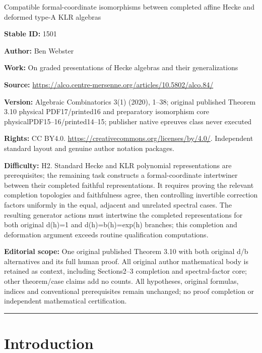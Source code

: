 \documentclass[10pt]{article}
\theoremstyle{definition}
\begin{document}
\glsaddall
\begin{center}\Large Compatible formal-coordinate isomorphisms between completed affine Hecke and deformed type-A KLR algebras\end{center}
\noindent\textbf{Stable ID:} 1501\par
\noindent\textbf{Author:} Ben Webster\par
\noindent\textbf{Work:} On graded presentations of Hecke algebras and their generalizations\par
\noindent\textbf{Source:} \url{https://alco.centre-mersenne.org/articles/10.5802/alco.84/}\par
\noindent\textbf{Version:} Algebraic Combinatorics 3(1) (2020), 1--38; original published Theorem 3.10 physical PDF17/printed16 and preparatory isomorphism core physicalPDF15--16/printed14--15; publisher native epreuves class never executed\par
\noindent\textbf{Rights:} CC BY4.0. \url{https://creativecommons.org/licenses/by/4.0/}. Independent standard layout and genuine author notation packages.\par
\noindent\textbf{Difficulty:} H2. Standard Hecke and KLR polynomial representations are prerequisites; the remaining task constructs a formal-coordinate intertwiner between their completed faithful representations. It requires proving the relevant completion topologies and faithfulness agree, then controlling invertible correction factors uniformly in the equal, adjacent and unrelated spectral cases. The resulting generator actions must intertwine the completed representations for both original d(h)=1 and d(h)=b(h)=exp(h) branches; this completion and deformation argument exceeds routine qualification computations.\par
\noindent\textbf{Editorial scope:} One original published Theorem 3.10 with both original d/b alternatives and its full human proof. All original author mathematical body is retained as context, including Sections2--3 completion and spectral-factor core; other theorem/case claims add no counts. All hypotheses, original formulas, indices and conventional prerequisites remain unchanged; no proof completion or independent mathematical certification.\par
\medskip\hrule\medskip
\section{Introduction}
\label{sec:introduction}
\end{document}
